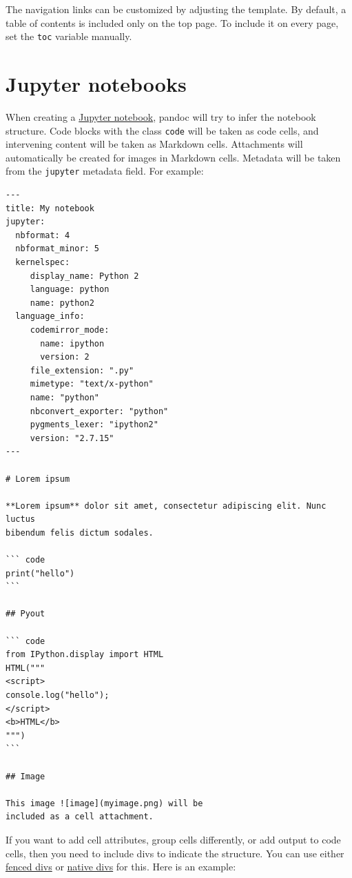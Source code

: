 \documentclass[
]{article}
\begin{document}
The navigation links can be customized by adjusting the template. By
default, a table of contents is included only on the top page. To
include it on every page, set the \texttt{toc} variable manually.

\hypertarget{jupyter-notebooks}{%
\section{Jupyter notebooks}\label{jupyter-notebooks}}

When creating a
\href{https://nbformat.readthedocs.io/en/latest/}{Jupyter notebook},
pandoc will try to infer the notebook structure. Code blocks with the
class \texttt{code} will be taken as code cells, and intervening content
will be taken as Markdown cells. Attachments will automatically be
created for images in Markdown cells. Metadata will be taken from the
\texttt{jupyter} metadata field. For example:

\begin{verbatim}
---
title: My notebook
jupyter:
  nbformat: 4
  nbformat_minor: 5
  kernelspec:
     display_name: Python 2
     language: python
     name: python2
  language_info:
     codemirror_mode:
       name: ipython
       version: 2
     file_extension: ".py"
     mimetype: "text/x-python"
     name: "python"
     nbconvert_exporter: "python"
     pygments_lexer: "ipython2"
     version: "2.7.15"
---

# Lorem ipsum

**Lorem ipsum** dolor sit amet, consectetur adipiscing elit. Nunc luctus
bibendum felis dictum sodales.

``` code
print("hello")
```

## Pyout

``` code
from IPython.display import HTML
HTML("""
<script>
console.log("hello");
</script>
<b>HTML</b>
""")
```

## Image

This image ![image](myimage.png) will be
included as a cell attachment.
\end{verbatim}

If you want to add cell attributes, group cells differently, or add
output to code cells, then you need to include divs to indicate the
structure. You can use either
\protect\hyperlink{extension-fenced_divs}{fenced divs} or
\protect\hyperlink{extension-native_divs}{native divs} for this. Here is
an example:
\end{document}
